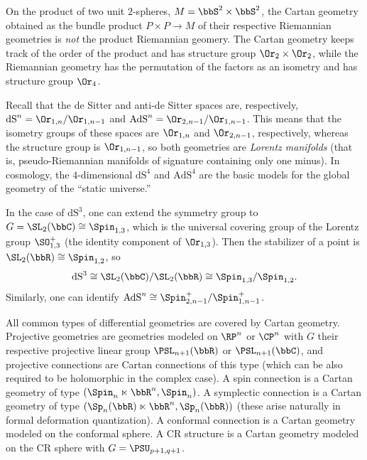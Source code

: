 \begin{example}
    On the product of two unit $2$-spheres, $M=\bbS^2\times\bbS^2$, the Cartan geometry obtained as the bundle product $P\times P\to M$ of their respective Riemannian geometries is \emph{not} the product Riemannian geomery. The Cartan geometry keeps track of the order of the product and has structure group $\Or_2\times\Or_2$, while the Riemannian geometry has the permutation of the factors as an isometry and has structure group $\Or_4$.
\end{example}

\begin{example}\label{ex dS and AdS 2}
    Recall that the de Sitter and anti-de Sitter spaces are, respectively, $\mathrm{dS}^n=\Or_{1,n}\slash \Or_{1,n-1}$ and $\mathrm{AdS}^n=\Or_{2,n-1}\slash \Or_{1,n-1}$. This means that the isometry groups of these spaces are $\Or_{1,n}$ and $\Or_{2,n-1}$, respectively, whereas the structure group is $\Or_{1,n-1}$, so both geometries are \emph{Lorentz manifolds}  (that is, pseudo-Riemannian manifolds of signature containing only one minus). In cosmology, the $4$-dimensional $\mathrm{dS}^4$ and $\mathrm{AdS}^4$ are the basic models for the global geometry of the ``static universe.''

    In the case of $\mathrm{dS}^3$, one can extend the symmetry group to $G=\SL_2(\bbC)\cong\Spin_{1,3}$, which is the universal covering group of the Lorentz group $\SO^+_{1,3}$ (the identity component of $\Or_{1,3}$). Then the stabilizer of a point is $\SL_2(\bbR)\cong \Spin_{1,2}$, so 
    \[\mathrm{dS}^3\cong \SL_2(\bbC)\slash\SL_2(\bbR)\cong \Spin_{1,3}\slash \Spin_{1,2}.\]
    Similarly, one can identify $\mathrm{AdS}^n\cong \Spin^+_{2,n-1}\slash \Spin^+_{1,n-1}$.
\end{example}

\begin{example}
    All common types of differential geometries are covered by Cartan geometry. Projective geometries are geometries modeled on $\RP^n$ or $\CP^n$ with $G$ their respective projective linear group $\PSL_{n+1}(\bbR)$ or $\PSL_{n+1}(\bbC)$, and projective connections are Cartan connections of this type (which can be also required to be holomorphic in the complex case). A spin connection is a Cartan geometry of type $(\Spin_n\ltimes\bbR^n,\Spin_n)$. A symplectic connection is a Cartan geometry of type $(\Sp_n(\bbR)\ltimes\bbR^n,\Sp_n(\bbR))$ (these arise naturally in formal deformation quantization). A conformal connection is a Cartan geometry modeled on the conformal sphere. A CR structure is a Cartan geometry modeled on the CR sphere with $G=\PSU_{p+1,q+1}$.
\end{example}

